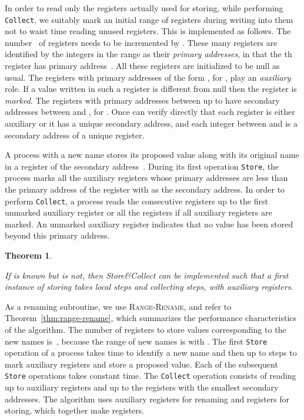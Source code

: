 \documentclass[11pt]{article}
\newcommand{\qed}{\hfill  \smallbreak}
\newenvironment{proof}{\noindent{\bf Proof:}}{\qed}
\newtheorem{theorem}{Theorem}
\begin{document}
In order to read only the registers actually used for storing, while performing \texttt{Collect}, we suitably mark an initial range of registers during writing into them not to waist time reading unused registers.
This is implemented as follows.
The number~ of registers needs to be incremented by . 
These many registers are identified by the integers in the range  as their \emph{primary addresses}, in that the th register has primary address~.
All these registers are initialized to be null as usual. 
The registers with primary addresses of the form , for , play an \emph{auxiliary} role.
If a value written in such a register is different from null then the register is \emph{marked}. 
The registers with primary addresses between  up to  have secondary addresses between  and , for .
Once can verify directly that each register is either auxiliary or it has a unique secondary address, and each integer between  and  is a secondary address of a unique register. 

A process with a new name  stores its proposed value along with its original name in a register of the secondary address~.
During its first operation \texttt{Store}, the process marks all the auxiliary registers whose primary addresses are less than the primary address of the register with  as the secondary address.
In order to perform \texttt{Collect}, a process reads the consecutive registers up to the first unmarked auxiliary register or all the registers if all auxiliary registers are marked.
An unmarked auxiliary register indicates that no value has been stored beyond this primary address.

\begin{theorem}
\label{thm:collect-only-N-known}

If  is known but  is not, then Store\&Collect can be implemented such that a first instance of storing takes  local steps and collecting  steps, with  auxiliary registers.
\end{theorem}

\begin{proof}
As a renaming subroutine, we use  \textsc{Range-Rename}, and refer to Theorem~\ref{thm:range-rename}, which summarizes the performance characteristics of the algorithm. 
The number of registers to store values corresponding to the new names is~, because the range of new names is  with .
The first \texttt{Store} operation of a process takes time  to identify a new name and then up to  steps to mark auxiliary registers and store a proposed value.
Each of the subsequent \texttt{Store} operations takes constant time.
The \texttt{Collect} operation consists of reading up to  auxiliary registers and up to the  registers with the smallest secondary addresses.
The algorithm uses  auxiliary registers for renaming and  registers for storing, which together make  registers.
\end{proof}
\end{document}
